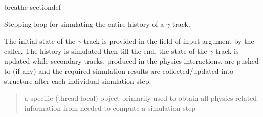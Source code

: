 \documentclass[letterpaper,10pt,english]{sphinxmanual}
\begin{document}
\begin{fulllineitems}
\begin{sphinxuseclass}{breathe-sectiondef}
\begin{fulllineitems}
\label{\detokenize{Simulation/SimulationCodeDoc:_CPPv4N12SteppingLoop12GammaStepperER13G4HepEmTLDataR12G4HepEmStateR10TrackStackR8GeometryR7Resultsi}}
\pysigstartsignatures
\pysigstartmultiline
{}
\pysigstopmultiline
\pysigstopsignatures
\sphinxAtStartPar
Stepping loop for simulating the entire history of a \(\gamma\) track. 

\sphinxAtStartPar
The initial state of the \(\gamma\) track is provided in the  field of  input argument by the caller. The history is simulated then till the end, the state of the \(\gamma\) track is updated while secondary tracks, produced in the physics interactions, are pushed to  (if any) and the required simulation results are collected/updated into  structure after each individual simulation step.

\sphinxAtStartPar
\begin{quote}\begin{description}
\sphinxAtStartPar
a  specific (thread local) object primarily used to obtain all physics related information from  needed to compute a simulation step 


\end{description}
\end{quote}
\end{fulllineitems}
\end{sphinxuseclass}
\end{fulllineitems}
\end{document}
